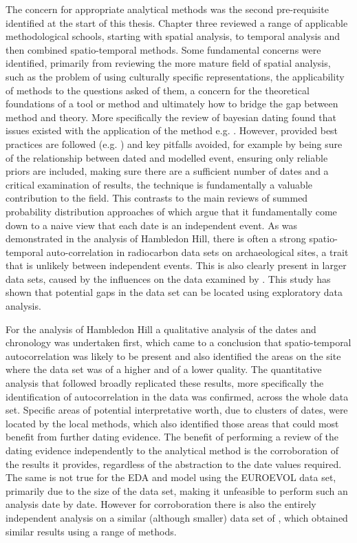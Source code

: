 The concern for appropriate analytical methods was the second pre-requisite identified at the start of this thesis. Chapter three reviewed a range of applicable methodological schools, starting with spatial analysis, to temporal analysis and then combined spatio-temporal methods. Some fundamental concerns were identified, primarily from reviewing the more mature field of spatial analysis, such as the problem of using culturally specific representations, the applicability of methods to the questions asked of them, a concern for the theoretical foundations of a tool or method and ultimately how to bridge the gap between method and theory. More specifically the review of bayesian dating found that issues existed with the application of the method e.g. \citet{doi:10.1080/00438243.2015.1070082}. However, provided best practices are followed (e.g. \citealp{doi:10.1080/00438243.2015.1067640}) and key pitfalls avoided, for example by being sure of the relationship between dated and modelled event, ensuring only reliable priors are included, making sure there are a sufficient number of dates and a critical examination of results, the technique is fundamentally a valuable contribution to the field. This contrasts to the main reviews of summed probability distribution approaches of \citet{CAJ:676108,Torfing2015193,McLaughlin2016} which argue that it fundamentally come down to a naive view that each date is an independent event. As was demonstrated in the analysis of Hambledon Hill, there is often a strong spatio-temporal auto-correlation in radiocarbon data sets on archaeological sites, a trait that is unlikely between independent events. This is also clearly present in larger data sets, caused by the influences on the data examined by \citet{Torfing2015193}. This study has shown that potential gaps in the data set can be located using exploratory data analysis. 

For the analysis of Hambledon Hill a qualitative analysis of the dates and chronology was undertaken first, which came to a conclusion that spatio-temporal autocorrelation was likely to be present and also identified the areas on the site where the data set was of a higher and of a lower quality. The quantitative analysis that followed broadly replicated these results, more specifically the identification of autocorrelation in the data was confirmed, across the whole data set. Specific areas of potential interpretative worth, due to clusters of dates, were located by the local methods, which also identified those areas that could most benefit from further dating evidence. The benefit of performing a review of the dating evidence independently to the analytical method is the corroboration of the results it provides, regardless of the abstraction to the date values required. The same is not true for the EDA and model using the EUROEVOL data set, primarily due to the size of the data set, making it unfeasible to perform such an analysis date by date. However for corroboration there is also the entirely independent analysis on a similar (although smaller) data set of \citet{gkiasta2003neolithic}, which obtained similar results using a range of methods.

